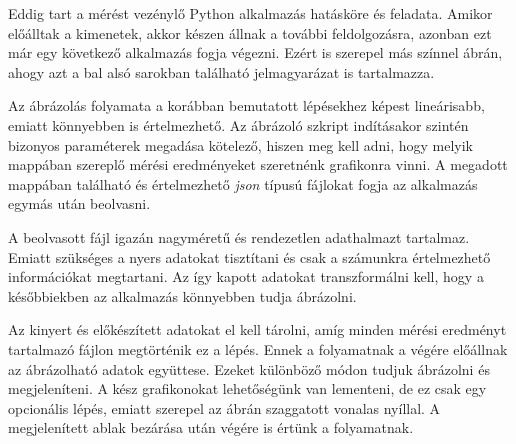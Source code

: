 Eddig tart a mérést vezénylő Python alkalmazás hatásköre és feladata.
Amikor előálltak a kimenetek, akkor készen állnak a további feldolgozásra, azonban ezt már egy következő alkalmazás fogja végezni.
Ezért is szerepel más színnel  ábrán, ahogy azt a bal alsó sarokban található jelmagyarázat is tartalmazza.

Az ábrázolás folyamata a korábban bemutatott lépésekhez képest lineárisabb, emiatt könnyebben is értelmezhető.
Az ábrázoló szkript indításakor szintén bizonyos paraméterek megadása kötelező, hiszen meg kell adni, hogy melyik mappában szereplő mérési eredményeket szeretnénk grafikonra vinni.
A megadott mappában található és értelmezhető \textit{json} típusú fájlokat fogja az alkalmazás egymás után beolvasni.

A beolvasott fájl igazán nagyméretű és rendezetlen adathalmazt tartalmaz.
Emiatt szükséges a nyers adatokat tisztítani és csak a számunkra értelmezhető információkat megtartani.
Az így kapott adatokat transzformálni kell, hogy a későbbiekben az alkalmazás könnyebben tudja ábrázolni.

Az kinyert és előkészített adatokat el kell tárolni, amíg minden mérési eredményt tartalmazó fájlon megtörténik ez a lépés. 
Ennek a folyamatnak a végére előállnak az ábrázolható adatok együttese.
Ezeket különböző módon tudjuk ábrázolni és megjeleníteni.
A kész grafikonokat lehetőségünk van lementeni, de ez csak egy opcionális lépés, emiatt szerepel az ábrán szaggatott vonalas nyíllal.
A megjelenített ablak bezárása után végére is értünk a folyamatnak.

